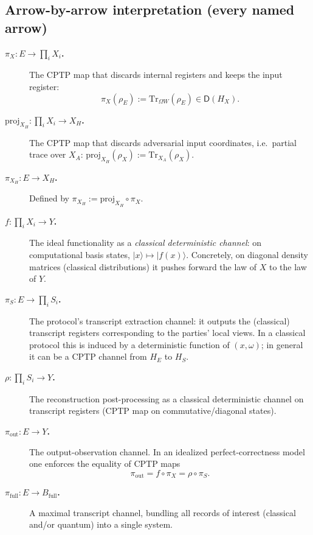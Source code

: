 \documentclass[11pt,a4paper]{article}
\theoremstyle{definition}
\theoremstyle{plain}
\begin{document}
\subsection{Arrow-by-arrow interpretation (every named arrow)}
\begin{description}
    \item[\textbf{$\pi_X:E\to \prod_i X_i$.}]
    The CPTP map that discards internal registers and keeps the input register:
    \[
    \pi_X(\rho_E) := \mathrm{Tr}_{\Omega W}(\rho_E) \in \mathsf{D}(H_X).
    \]

    \item[\textbf{$\mathrm{proj}_{X_H}:\prod_i X_i\to X_H$.}]
    The CPTP map that discards adversarial input coordinates, i.e.\ partial trace over $X_A$:
    $\mathrm{proj}_{X_H}(\rho_X):=\mathrm{Tr}_{X_A}(\rho_X)$.

    \item[\textbf{$\pi_{X_H}:E\to X_H$.}]
    Defined by $\pi_{X_H}:=\mathrm{proj}_{X_H}\circ \pi_X$.

    \item[\textbf{$f:\prod_i X_i\to Y$.}]
    The ideal functionality as a \emph{classical deterministic channel}:
    on computational basis states, $\lvert x\rangle\mapsto \lvert f(x)\rangle$.
    Concretely, on diagonal density matrices (classical distributions) it pushes forward the law of $X$ to the law of $Y$.

    \item[\textbf{$\pi_S:E\to \prod_i S_i$.}]
    The protocol's transcript extraction channel: it outputs the (classical) transcript registers corresponding to the parties' local views.
    In a classical protocol this is induced by a deterministic function of $(x,\omega)$; in general it can be a CPTP channel from $H_E$ to $H_S$.

    \item[\textbf{$\rho:\prod_i S_i\to Y$.}]
    The reconstruction post-processing as a classical deterministic channel on transcript registers (CPTP map on commutative/diagonal states).

    \item[\textbf{$\pi_{\mathrm{out}}:E\to Y$.}]
    The output-observation channel. In an idealized perfect-correctness model one enforces the equality of CPTP maps
    \[
    \pi_{\mathrm{out}} = f\circ \pi_X = \rho\circ \pi_S.
    \]

    \item[\textbf{$\pi_{\mathrm{full}}:E\to B_{\mathrm{full}}$.}]
    A maximal transcript channel, bundling all records of interest (classical and/or quantum) into a single system.


\end{description}
\end{document}
